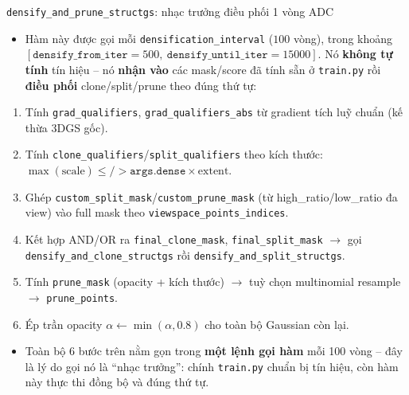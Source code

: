 
\begin{frame}{\texttt{densify\_and\_prune\_structgs}: nhạc trưởng điều phối 1 vòng ADC}
\footnotesize
\begin{itemize}
    \item Hàm này được gọi mỗi \texttt{densification\_interval} ($100$ vòng), trong khoảng $[\texttt{densify\_from\_iter}{=}500,\ \texttt{densify\_until\_iter}{=}15000]$. Nó \textbf{không tự tính} tín hiệu -- nó \textbf{nhận vào} các mask/score đã tính sẵn ở \texttt{train.py} rồi \textbf{điều phối} clone/split/prune theo đúng thứ tự:
\end{itemize}
\begin{enumerate}
    \item Tính \texttt{grad\_qualifiers}, \texttt{grad\_qualifiers\_abs} từ gradient tích luỹ chuẩn (kế thừa 3DGS gốc).
    \item Tính \texttt{clone\_qualifiers}/\texttt{split\_qualifiers} theo kích thước: $\max(\text{scale}) \le/> \texttt{args.dense}\times\text{extent}$.
    \item Ghép \texttt{custom\_split\_mask}/\texttt{custom\_prune\_mask} (từ high\_ratio/low\_ratio đa view) vào full mask theo \texttt{viewspace\_points\_indices}.
    \item Kết hợp AND/OR ra \texttt{final\_clone\_mask}, \texttt{final\_split\_mask} $\to$ gọi \texttt{densify\_and\_clone\_structgs} rồi \texttt{densify\_and\_split\_structgs}.
    \item Tính \texttt{prune\_mask} (opacity + kích thước) $\to$ tuỳ chọn multinomial resample $\to$ \texttt{prune\_points}.
    \item Ép trần opacity $\alpha \leftarrow \min(\alpha, 0.8)$ cho toàn bộ Gaussian còn lại.
\end{enumerate}
\begin{itemize}
    \item Toàn bộ 6 bước trên nằm gọn trong \textbf{một lệnh gọi hàm} mỗi 100 vòng -- đây là lý do gọi nó là ``nhạc trưởng'': chính \texttt{train.py} chuẩn bị tín hiệu, còn hàm này thực thi đồng bộ và đúng thứ tự.
\end{itemize}
\end{frame}

